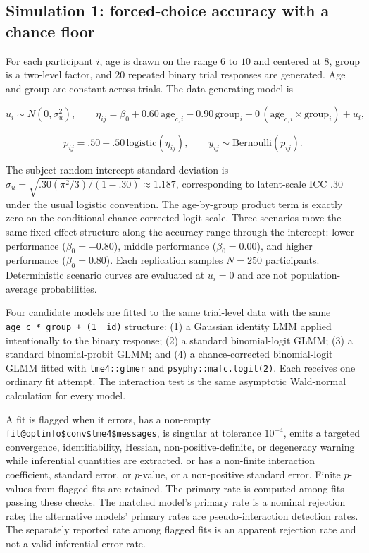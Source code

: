\documentclass[
  man,
  floatsintext,
  longtable,
  nolmodern,
  notxfonts,
  notimes,
  colorlinks=true,linkcolor=blue,citecolor=blue,urlcolor=blue]{apa7}
\begin{document}
\subsection{Simulation 1: forced-choice accuracy with a chance
floor}\label{simulation-1-forced-choice-accuracy-with-a-chance-floor}

For each participant \(i\), age is drawn on the range \(6\) to \(10\)
and centered at \(8\), group is a two-level factor, and 20 repeated
binary trial responses are generated. Age and group are constant across
trials. The data-generating model is

\[
u_i \sim N(0, \sigma_u^2), \qquad
\eta_{ij} = \beta_0 + 0.60\,\text{age}_{c,i} - 0.90\,\text{group}_i
+ 0\,(\text{age}_{c,i} \times \text{group}_i) + u_i,
\]

\[
p_{ij} = .50 + .50\,\mathrm{logistic}(\eta_{ij}), \qquad
y_{ij} \sim \mathrm{Bernoulli}(p_{ij}).
\]

The subject random-intercept standard deviation is
\(\sigma_u = \sqrt{.30(\pi^2/3)/(1-.30)} \approx 1.187\), corresponding
to latent-scale ICC \(.30\) under the usual logistic convention. The
age-by-group product term is exactly zero on the conditional
chance-corrected-logit scale. Three scenarios move the same fixed-effect
structure along the accuracy range through the intercept: lower
performance (\(\beta_0 = -0.80\)), middle performance
(\(\beta_0 = 0.00\)), and higher performance (\(\beta_0 = 0.80\)). Each
replication samples \(N = 250\) participants. Deterministic scenario
curves are evaluated at \(u_i = 0\) and are not population-average
probabilities.

Four candidate models are fitted to the same trial-level data with the
same \texttt{age\_c\ *\ group\ +\ (1\ \textbar{}\ id)} structure: (1) a
Gaussian identity LMM applied intentionally to the binary response; (2)
a standard binomial-logit GLMM; (3) a standard binomial-probit GLMM; and
(4) a chance-corrected binomial-logit GLMM fitted with
\texttt{lme4::glmer} and \texttt{psyphy::mafc.logit(2)}. Each receives
one ordinary fit attempt. The interaction test is the same asymptotic
Wald-normal calculation for every model.

A fit is flagged when it errors, has a non-empty
\texttt{fit@optinfo\$conv\$lme4\$messages}, is singular at tolerance
\(10^{-4}\), emits a targeted convergence, identifiability, Hessian,
non-positive-definite, or degeneracy warning while inferential
quantities are extracted, or has a non-finite interaction coefficient,
standard error, or \(p\)-value, or a non-positive standard error. Finite
\(p\)-values from flagged fits are retained. The primary rate is
computed among fits passing these checks. The matched model's primary
rate is a nominal rejection rate; the alternative models' primary rates
are pseudo-interaction detection rates. The separately reported rate
among flagged fits is an apparent rejection rate and not a valid
inferential error rate.
\end{document}
